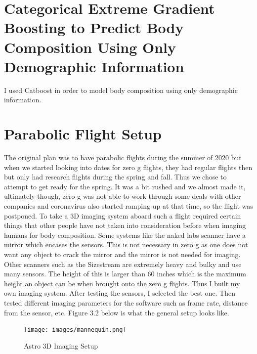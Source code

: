 \section{Categorical Extreme Gradient Boosting to Predict Body Composition Using Only Demographic Information}
I used Catboost \cite{DBLP:journals/corr/DorogushGGKPV17} in order to model body composition using only demographic information. 

\section{Parabolic Flight Setup}
The original plan was to have parabolic flights during the summer of 2020 but when we started looking into dates for zero g flights, they had regular flights then but only had research flights during the spring and fall. Thus we chose to attempt to get ready for the spring. It was a bit rushed and we almost made it, ultimately though, zero g was not able to work through some deals with other companies and coronavirus also started ramping up at that time, so the flight was postponed.
To take a 3D imaging system aboard such a flight required certain things that other people have not taken into consideration before when imaging humans for body composition. Some systems like the naked labs scanner have a mirror which encases the sensors. This is not necessary in zero g as one does not want any object to crack the mirror and the mirror is not needed for imaging. Other scanners such as the Sizestream are extremely heavy and bulky and use many sensors. The height of this is larger than 60 inches which is the maximum height an object can be when brought onto the zero g flights. Thus I built my own imaging system. After testing the sensors, I selected the best one. Then tested different imaging parameters for the software such as frame rate, distance from the sensor, etc.
Figure 3.2 below is what the general setup looks like.
\begin{figure}[!htb]
	\caption{Astro 3D Imaging Setup}
	\centering
	\texttt{[image: images/mannequin.png]}
\end{figure}

